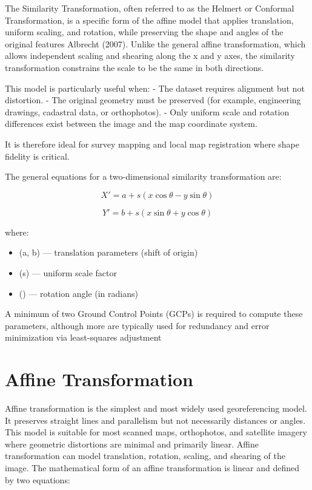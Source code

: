 \documentclass[
  11pt,
  letterpaper,
]{book}
\providecommand{\tightlist}{%
  \setlength{\itemsep}{0pt}\setlength{\parskip}{0pt}}
\begin{document}
The Similarity Transformation, often referred to as the Helmert or
Conformal Transformation, is a specific form of the affine model that
applies translation, uniform scaling, and rotation, while preserving the
shape and angles of the original features Albrecht (2007). Unlike the
general affine transformation, which allows independent scaling and
shearing along the x and y axes, the similarity transformation
constrains the scale to be the same in both directions.

This model is particularly useful when: - The dataset requires alignment
but not distortion. - The original geometry must be preserved (for
example, engineering drawings, cadastral data, or orthophotos). - Only
uniform scale and rotation differences exist between the image and the
map coordinate system.

It is therefore ideal for survey mapping and local map registration
where shape fidelity is critical.

The general equations for a two-dimensional similarity transformation
are:

\[
X' = a + s(x\cos\theta - y\sin\theta)
\]

\[
Y' = b + s(x\sin\theta + y\cos\theta)
\]

where:

\begin{itemize}
\tightlist
\item
  (a, b) --- translation parameters (shift of origin)\\
\item
  (s) --- uniform scale factor\\
\item
  (\theta) --- rotation angle (in radians)
\end{itemize}

A minimum of two Ground Control Points (GCPs) is required to compute
these parameters, although more are typically used for redundancy and
error minimization via least-squares adjustment

\section{Affine Transformation}\label{affine-transformation}

Affine transformation is the simplest and most widely used
georeferencing model. It preserves straight lines and parallelism but
not necessarily distances or angles. This model is suitable for most
scanned maps, orthophotos, and satellite imagery where geometric
distortions are minimal and primarily linear. Affine transformation can
model translation, rotation, scaling, and shearing of the image. The
mathematical form of an affine transformation is linear and defined by
two equations:
\end{document}
